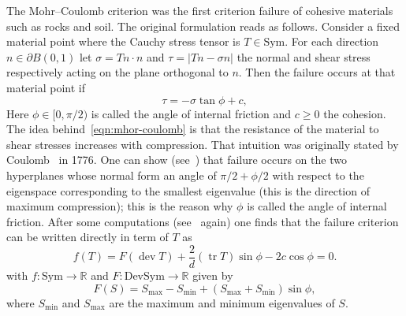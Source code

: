 \documentclass[a4paper,10pt,twoside]{amsbook}
\numberwithin{section}{chapter}
\numberwithin{equation}{chapter}
\theoremstyle{definition}
\DeclareMathOperator{\dev}{dev}
\DeclareMathOperator{\tr}{tr}
\begin{document}
The Mohr--Coulomb criterion was the first criterion failure of cohesive materials such as rocks and soil. The original formulation reads as follows. Consider a fixed material point where the Cauchy stress tensor is $T\in\text{Sym}$. For each direction $n\in\partial B(0,1)$ let $\sigma=Tn\cdot n$ and $\tau=|Tn-\sigma n|$ the normal and shear stress respectively acting on the plane orthogonal to $n$. Then the failure occurs at that material point if
\begin{equation}
\label{eqn:mhor-coulomb}
\tau=-\sigma\tan\phi+c,
\end{equation}
Here $\phi\in[0,\pi/2)$ is called the angle of internal friction and $c\ge0$ the cohesion. The idea behind~\eqref{eqn:mhor-coulomb} is that the resistance of the material to shear stresses increases with compression. That intuition was originally stated by Coulomb~\cite{Coulomb1776} in 1776. One can show (see~\cite{Lubliner1990}) that failure occurs on the two hyperplanes whose normal form an angle of $\pi/2+\phi/2$ with respect to the eigenspace corresponding to the smallest eigenvalue (this is the direction of maximum compression); this is the reason why $\phi$ is called the angle of internal friction.
After some computations (see~\cite{Lubliner1990} again) one finds that the failure criterion can be written directly in term of $T$ as
\begin{equation}
\label{eqn:f-mohr-coulomb}
f(T)=F(\dev T)+\frac{2}{d}(\tr T)\sin\phi-2c\cos\phi=0.
\end{equation}
with $f\colon\text{Sym}\to\mathbb{R}$ and $F\colon\text{DevSym}\to\mathbb{R}$ given by
\begin{equation}
\label{eqn:F-mohr-coulomb}
F(S)=S_\text{max}-S_\text{min}+(S_\text{max}+S_\text{min})\sin\phi,
\end{equation}
where $S_\text{min}$ and $S_\text{max}$ are the maximum and minimum eigenvalues of $S$.
\end{document}

